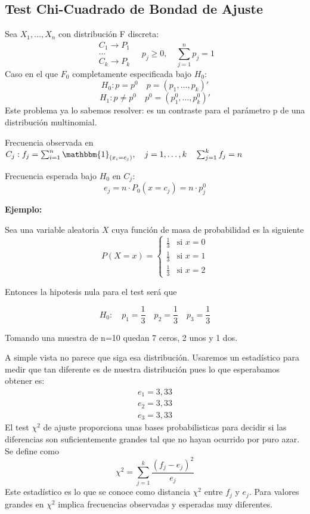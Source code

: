 \subsection{Test Chi-Cuadrado de Bondad de Ajuste}

Sea $X_1,\dots,X_n$ con distribución F discreta:
\[
    \begin{matrix}
        C_1 \to P_1\\
        \dots \\
        C_k \to P_k
    \end{matrix}
    \quad
    p_j \geq 0,
    \quad \sum_{j=1}^{n} p_j=1
\]
Caso en el que $F_0$ completamente especificada bajo $H_0$:
\[
    H_0: p=p^0 \quad p=(p_1,\dots,p_k)'
\]
\[
    H_1: p \neq p^0 \quad p^0=(p_1^0,\dots,p_k^0)'
\]
Este problema ya lo sabemos resolver: es un contraste para el parámetro p de una distribución multinomial.

Frecuencia observada en $C_j: f_j=\sum_{i=1}^{n} \mathbbm{1}_{(x_i=c_j)}, \quad j=1,\dots,k \quad \sum_{j=1}^{k} f_j=n$

Frecuencia esperada bajo $H_0$ en $C_j$:
\[
    e_j=n \cdot P_0(x=c_j)=n \cdot p_j^0
\]

\textbf{Ejemplo:}

Sea una variable aleatoria $X$ cuya función de masa de probabilidad es la siguiente
\[
    P(X = x) = 
    \left\{
        \begin{matrix}
            \frac{1}{3} & \text{si } x = 0 \\[0.5em]
            \frac{1}{3} & \text{si } x = 1 \\[0.5em]
            \frac{1}{3} & \text{si } x = 2
        \end{matrix}
    \right.
\]

Entonces la hipotesis nula para el test será que

\[
    H_0:\quad p_1=\frac{1}{3} \quad p_2=\frac{1}{3} \quad p_3=\frac{1}{3}
\]

Tomando una muestra de n=10 quedan 7 ceros, 2 unos y 1 dos.

\vspace{5mm}

A simple vista no parece que siga esa distribución. Usaremos un estadístico para medir que tan diferente es de nuestra distribución pues lo que esperabamos obtener es:
\[
    \begin{matrix}
        e_1=3,33\\
        e_2=3,33\\
        e_3=3,33
    \end{matrix}
\]
El test $\chi^2$ de ajuste proporciona unas bases probabilisticas para decidir si las diferencias son suficientemente grandes tal que no hayan ocurrido por puro azar. Se define como
\[
    \chi^2=\sum_{j=1}^{k} \frac{(f_j-e_j)^2}{e_j}
\]
Este estadístico es lo que se conoce como distancia $\chi^2$ entre $f_j$ y $e_j$. Para valores grandes en $\chi^2$ implica frecuencias observadas y esperadas muy diferentes. 

